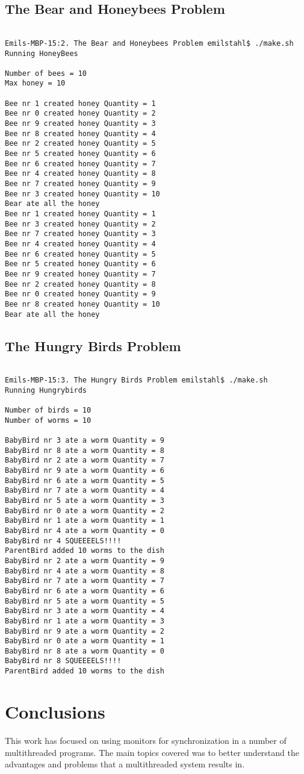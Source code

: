 \documentclass{article}
\begin{document}
\subsection{The Bear and Honeybees Problem}
\begin{verbatim}

Emils-MBP-15:2. The Bear and Honeybees Problem emilstahl$ ./make.sh
Running HoneyBees
 
Number of bees = 10
Max honey = 10

Bee nr 1 created honey Quantity = 1
Bee nr 0 created honey Quantity = 2
Bee nr 9 created honey Quantity = 3
Bee nr 8 created honey Quantity = 4
Bee nr 2 created honey Quantity = 5
Bee nr 5 created honey Quantity = 6
Bee nr 6 created honey Quantity = 7
Bee nr 4 created honey Quantity = 8
Bee nr 7 created honey Quantity = 9
Bee nr 3 created honey Quantity = 10
Bear ate all the honey
Bee nr 1 created honey Quantity = 1
Bee nr 3 created honey Quantity = 2
Bee nr 7 created honey Quantity = 3
Bee nr 4 created honey Quantity = 4
Bee nr 6 created honey Quantity = 5
Bee nr 5 created honey Quantity = 6
Bee nr 9 created honey Quantity = 7
Bee nr 2 created honey Quantity = 8
Bee nr 0 created honey Quantity = 9
Bee nr 8 created honey Quantity = 10
Bear ate all the honey
\end{verbatim}
\clearpage
\subsection{The Hungry Birds Problem}
\begin{verbatim}

Emils-MBP-15:3. The Hungry Birds Problem emilstahl$ ./make.sh
Running Hungrybirds
 
Number of birds = 10
Number of worms = 10

BabyBird nr 3 ate a worm Quantity = 9
BabyBird nr 8 ate a worm Quantity = 8
BabyBird nr 2 ate a worm Quantity = 7
BabyBird nr 9 ate a worm Quantity = 6
BabyBird nr 6 ate a worm Quantity = 5
BabyBird nr 7 ate a worm Quantity = 4
BabyBird nr 5 ate a worm Quantity = 3
BabyBird nr 0 ate a worm Quantity = 2
BabyBird nr 1 ate a worm Quantity = 1
BabyBird nr 4 ate a worm Quantity = 0
BabyBird nr 4 SQUEEEELS!!!!
ParentBird added 10 worms to the dish
BabyBird nr 2 ate a worm Quantity = 9
BabyBird nr 4 ate a worm Quantity = 8
BabyBird nr 7 ate a worm Quantity = 7
BabyBird nr 6 ate a worm Quantity = 6
BabyBird nr 5 ate a worm Quantity = 5
BabyBird nr 3 ate a worm Quantity = 4
BabyBird nr 1 ate a worm Quantity = 3
BabyBird nr 9 ate a worm Quantity = 2
BabyBird nr 0 ate a worm Quantity = 1
BabyBird nr 8 ate a worm Quantity = 0
BabyBird nr 8 SQUEEEELS!!!!
ParentBird added 10 worms to the dish
\end{verbatim}



\section{Conclusions}

This work has focused on using monitors for synchronization in a number of multithreaded programs. The main topics covered was to better understand the advantages and problems that a multithreaded system results in. 
 












\end{document}
